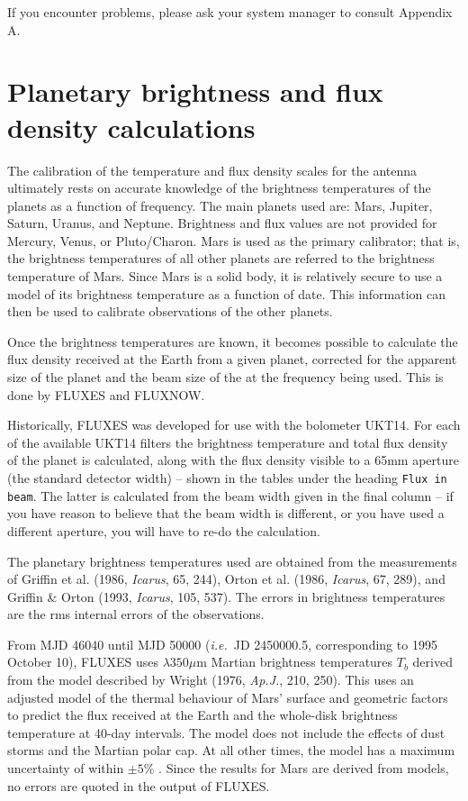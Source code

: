 \documentclass[11pt,twoside]{starlink}
\begin{document}
If you encounter problems, please ask your system manager to consult
Appendix A.

\section{Planetary brightness and flux density calculations}
\label{sec:planet}

The calibration of the temperature and flux density scales for the
 antenna
ultimately rests on accurate knowledge of the brightness temperatures of the
planets as a function of frequency.
The main planets used are: Mars, Jupiter, Saturn, Uranus, and Neptune.
Brightness and flux values are not provided for Mercury, Venus, or Pluto/Charon.
Mars is used as the primary calibrator; that is, the brightness
temperatures of all other planets are referred to the brightness temperature of
Mars. Since Mars is a solid body, it is relatively secure to use a model of its
brightness temperature as a function of date. This information can then be used
to calibrate observations of the other planets.

Once the brightness temperatures are known, it becomes possible to calculate
the flux density received at the Earth from a given planet, corrected for the
apparent size of the planet and the beam size of the
at the frequency being used.
This is done by FLUXES and FLUXNOW.

Historically, FLUXES was developed for use with the bolometer UKT14.
For each of the available UKT14 filters the brightness temperature
and total flux density of the planet is calculated, along with the flux density
visible to a 65mm aperture (the standard detector width) -- shown in the
tables under the heading \texttt{Flux in beam}.
The latter is calculated from the beam width given in the final column -- if
you have reason to believe that the beam width is different, or you have used a
different aperture, you will have to re-do the calculation.

The planetary brightness temperatures used are obtained from the measurements
of Griffin et al. (1986, \textit{Icarus}, 65, 244), Orton et al.
(1986, \textit{Icarus}, 67, 289),
and Griffin \& Orton (1993, \textit{Icarus}, 105, 537). The errors in brightness
temperatures are the rms internal errors of the observations.

From MJD 46040 until MJD 50000 (\emph{i.e.}\ JD 2450000.5, corresponding to 1995
October 10), FLUXES uses $\lambda350\mu$m Martian brightness temperatures
$T_b$ derived from the model described by Wright (1976, \textit{Ap.J.}, 210, 250).
This uses an adjusted model of the thermal
behaviour of Mars' surface and geometric factors to predict the flux received at
the Earth and the whole-disk brightness temperature at 40-day intervals. The
model does not include the effects of dust storms and the Martian polar cap. At
all other times, the model has a maximum uncertainty of within $\pm5$\% . Since
the results for Mars are derived from models, no errors are quoted in the output
of FLUXES.
\end{document}
